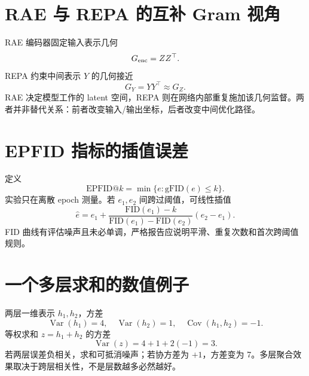 \documentclass[UTF8,12pt,a4paper,fontset=none]{ctexart}
\numberwithin{equation}{section}
\begin{document}
\section{RAE 与 REPA 的互补 Gram 视角}
RAE 编码器固定输入表示几何
\begin{equation}
 G_{\rm enc}=ZZ^\top.
\end{equation}
REPA 约束中间表示 $Y$ 的几何接近
\begin{equation}
 G_Y=YY^\top\approx G_Z.
\end{equation}
RAE 决定模型工作的 latent 空间，REPA 则在网络内部重复施加该几何监督。两者并非替代关系：前者改变输入/输出坐标，后者改变中间优化路径。

\section{EPFID 指标的插值误差}
定义
\begin{equation}
 \mathrm{EPFID}@k=
 \min\{e:\mathrm{gFID}(e)\le k\}.
\end{equation}
实验只在离散 epoch 测量。若 $e_1,e_2$ 间跨过阈值，可线性插值
\begin{equation}
 \widehat e=e_1+
 \frac{\mathrm{FID}(e_1)-k}
 {\mathrm{FID}(e_1)-\mathrm{FID}(e_2)}(e_2-e_1).
\end{equation}
FID 曲线有评估噪声且未必单调，严格报告应说明平滑、重复次数和首次跨阈值规则。

\section{一个多层求和的数值例子}
两层一维表示 $h_1,h_2$，方差
\begin{equation}
 \operatorname{Var}(h_1)=4,
 \quad \operatorname{Var}(h_2)=1,
 \quad \operatorname{Cov}(h_1,h_2)=-1.
\end{equation}
等权求和 $z=h_1+h_2$ 的方差
\begin{equation}
 \operatorname{Var}(z)=4+1+2(-1)=3.
\end{equation}
若两层误差负相关，求和可抵消噪声；若协方差为 $+1$，方差变为 7。多层聚合效果取决于跨层相关性，不是层数越多必然越好。
\end{document}
